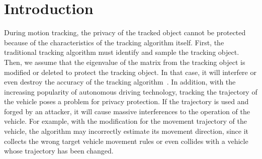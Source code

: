 \documentclass[trans]{IEEEtran}
\newcommand{\el}[1]{{\color{black}#1}}
\begin{document}







%



\section{Introduction}
%
%
%
%

\el{During motion tracking}, the privacy of the tracked object cannot be protected because of the characteristics of the tracking algorithm itself. First, the traditional tracking algorithm must identify and sample the tracking object. Then, \el{we assume that the eigenvalue} of the matrix from the tracking object is modified or deleted to protect the tracking object. In that case, it will \el{ interfere} or even destroy the accuracy of the tracking algorithm~\cite{guo2021topology}. In addition, with the increasing popularity of autonomous driving technology, tracking \el{ the trajectory of the vehicle} poses a problem for privacy protection. \el{ If the trajectory is used and forged by an attacker, it will cause massive interferences to the operation of the vehicle.} For example, with \el{ the modification for the movement trajectory of the vehicle, the algorithm may incorrectly estimate its movement direction, since} it collects the wrong target vehicle movement rules or even collides with a vehicle whose trajectory has been changed.
\end{document}
